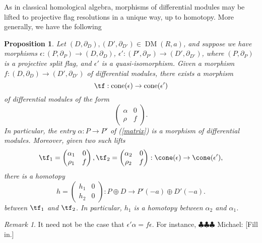 \documentclass[12pt]{amsart}
\newtheorem{prop}[lemma]{Proposition}
\theoremstyle{definition}
\theoremstyle{remark}
\newtheorem{rem}[lemma]{Remark}
\newcommand{\michael}[1]{{\color{red} \sf $\clubsuit\clubsuit\clubsuit$ Michael: [#1]}}
\def\on{\operatorname}
\def\a{\alpha}
\def\DM{\operatorname{DM}}
\begin{document}
As in classical homological algebra, morphisms of differential modules may be lifted to projective flag resolutions in a unique way, up to homotopy.  More generally, we have the following

\begin{prop}\label{prop:lifting}
Let $(D, \partial_D), (D', \partial_{D'}) \in \DM(R, a)$, and suppose we have morphisms $\epsilon : (P, \partial_P) \to (D, \partial_D)$, $\epsilon' : (P', \partial_{P'}) \to (D', \partial_{D'})$, where $(P, \partial_P)$ is a projective split flag, and $\epsilon'$ is a quasi-isomorphism. Given a morphism $f: (D, \partial_D) \to (D', \partial_{D'})$ of differential modules, there exists a morphism
$$
\tf:  \on{cone}(\epsilon) \to \on{cone}(\epsilon')
$$ 
of differential modules of the form 
\begin{equation}
\label{matrix}
\begin{pmatrix}
\alpha & 0  \\
\rho & f
\end{pmatrix}.
\end{equation}
In particular, the entry $\a: P \to P'$ of (\ref{matrix}) is a morphism of differential modules. Moreover, given two such lifts
$$
\tf_1 = \begin{pmatrix}
\alpha_1 & 0  \\
\rho_1 & f
\end{pmatrix}, 
\tf_2 = \begin{pmatrix}
\alpha_2 & 0  \\
\rho_2 & f
\end{pmatrix}
: \cone(\epsilon) \to \cone(\epsilon'),
$$
there is a homotopy 
$$
h = \begin{pmatrix} h_1 &0 \\ h_2 & 0 \end{pmatrix} : P \oplus D \to P'(-a) \oplus D'(-a).
$$
between $\tf_1$ and $\tf_2$. In particular, $h_1$ is a homotopy between $\a_2$ and $\a_1$.
\end{prop}

\begin{rem}
It need not be the case that $\epsilon' \a = f \epsilon$. For instance, \michael{Fill in.}
\end{rem}
\end{document}
